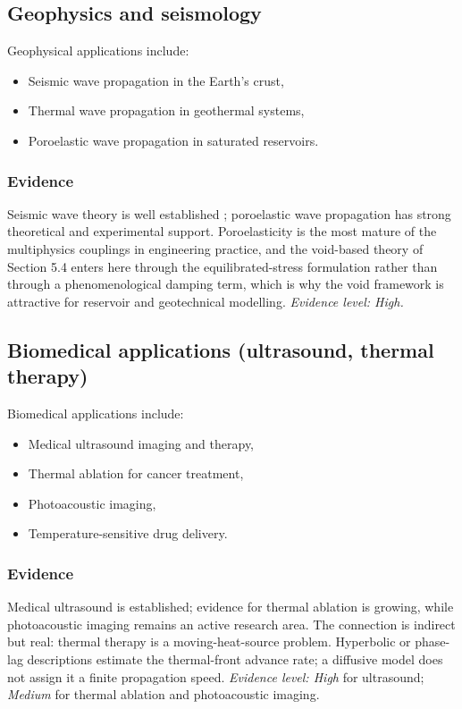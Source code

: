 \subsection{Geophysics and seismology}
\label{sec:13.4}

Geophysical applications include:
\begin{itemize}
\item Seismic wave propagation in the Earth's crust,
\item Thermal wave propagation in geothermal systems,
\item Poroelastic wave propagation in saturated reservoirs.
\end{itemize}

\subsubsection{Evidence}
Seismic wave theory is well established \cite{Achenbach1973}; poroelastic wave propagation has strong theoretical and experimental support. Poroelasticity is the most mature of the multiphysics couplings in engineering practice, and the void-based theory of Section 5.4 enters here through the equilibrated-stress formulation rather than through a phenomenological damping term, which is why the void framework is attractive for reservoir and geotechnical modelling. \emph{Evidence level: High.}

\subsection{Biomedical applications (ultrasound, thermal therapy)}
\label{sec:13.5}

Biomedical applications include:
\begin{itemize}
\item Medical ultrasound imaging and therapy,
\item Thermal ablation for cancer treatment,
\item Photo\-acoustic imaging,
\item Temperature-sensitive drug delivery.
\end{itemize}

\subsubsection{Evidence}
Medical ultrasound is established; evidence for thermal ablation is growing, while photo\-acoustic imaging remains an active research area. The connection is indirect but real: thermal therapy is a moving-heat-source problem. Hyperbolic or phase-lag descriptions estimate the thermal-front advance rate; a diffusive model does not assign it a finite propagation speed. \emph{Evidence level: High} for ultrasound; \emph{Medium} for thermal ablation and photo\-acoustic imaging.

